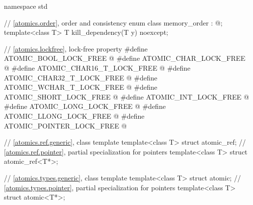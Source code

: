 %
\begin{codeblock}
namespace std {
  // \ref{atomics.order}, order and consistency
  enum class memory_order : @\unspec@;
  template<class T>
    T kill_dependency(T y) noexcept;

  // \ref{atomics.lockfree}, lock-free property
  #define ATOMIC_BOOL_LOCK_FREE @\unspec@
  #define ATOMIC_CHAR_LOCK_FREE @\unspec@
  #define ATOMIC_CHAR16_T_LOCK_FREE @\unspec@
  #define ATOMIC_CHAR32_T_LOCK_FREE @\unspec@
  #define ATOMIC_WCHAR_T_LOCK_FREE @\unspec@
  #define ATOMIC_SHORT_LOCK_FREE @\unspec@
  #define ATOMIC_INT_LOCK_FREE @\unspec@
  #define ATOMIC_LONG_LOCK_FREE @\unspec@
  #define ATOMIC_LLONG_LOCK_FREE @\unspec@
  #define ATOMIC_POINTER_LOCK_FREE @\unspec@

  // \ref{atomics.ref.generic}, class template 
  template<class T> struct atomic_ref;
  // \ref{atomics.ref.pointer}, partial specialization for pointers
  template<class T> struct atomic_ref<T*>;

  // \ref{atomics.types.generic}, class template 
  template<class T> struct atomic;
  // \ref{atomics.types.pointer}, partial specialization for pointers
  template<class T> struct atomic<T*>;

}
\end{codeblock}
